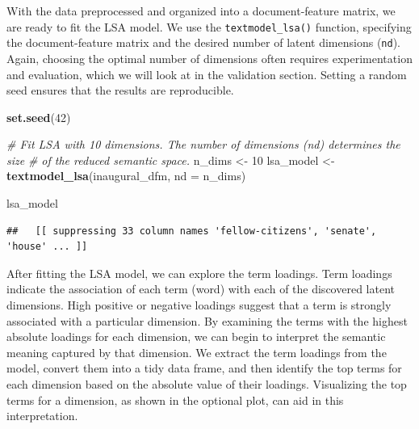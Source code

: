 \documentclass[
]{book}
\newenvironment{Shaded}{\begin{snugshade}}{\end{snugshade}}
\newcommand{\AttributeTok}[1]{\textcolor[rgb]{0.13,0.29,0.53}{#1}}
\newcommand{\CommentTok}[1]{\textcolor[rgb]{0.56,0.35,0.01}{\textit{#1}}}
\newcommand{\DecValTok}[1]{\textcolor[rgb]{0.00,0.00,0.81}{#1}}
\newcommand{\FunctionTok}[1]{\textcolor[rgb]{0.13,0.29,0.53}{\textbf{#1}}}
\newcommand{\NormalTok}[1]{#1}
\newcommand{\OtherTok}[1]{\textcolor[rgb]{0.56,0.35,0.01}{#1}}
\begin{document}
With the data preprocessed and organized into a document-feature matrix, we are ready to fit the LSA model. We use the \texttt{textmodel\_lsa()} function, specifying the document-feature matrix and the desired number of latent dimensions (\texttt{nd}). Again, choosing the optimal number of dimensions often requires experimentation and evaluation, which we will look at in the validation section. Setting a random seed ensures that the results are reproducible.

\begin{Shaded}
\begin{Highlighting}[]
\FunctionTok{set.seed}\NormalTok{(}\DecValTok{42}\NormalTok{)}

\CommentTok{\# Fit LSA with 10 dimensions. The number of dimensions (nd) determines the size}
\CommentTok{\# of the reduced semantic space.}
\NormalTok{n\_dims }\OtherTok{\textless{}{-}} \DecValTok{10}
\NormalTok{lsa\_model }\OtherTok{\textless{}{-}} \FunctionTok{textmodel\_lsa}\NormalTok{(inaugural\_dfm, }\AttributeTok{nd =}\NormalTok{ n\_dims)}

\NormalTok{lsa\_model}
\end{Highlighting}
\end{Shaded}

\begin{verbatim}
##   [[ suppressing 33 column names 'fellow-citizens', 'senate', 'house' ... ]]
\end{verbatim}

After fitting the LSA model, we can explore the term loadings. Term loadings indicate the association of each term (word) with each of the discovered latent dimensions. High positive or negative loadings suggest that a term is strongly associated with a particular dimension. By examining the terms with the highest absolute loadings for each dimension, we can begin to interpret the semantic meaning captured by that dimension. We extract the term loadings from the model, convert them into a tidy data frame, and then identify the top terms for each dimension based on the absolute value of their loadings. Visualizing the top terms for a dimension, as shown in the optional plot, can aid in this interpretation.
\end{document}
